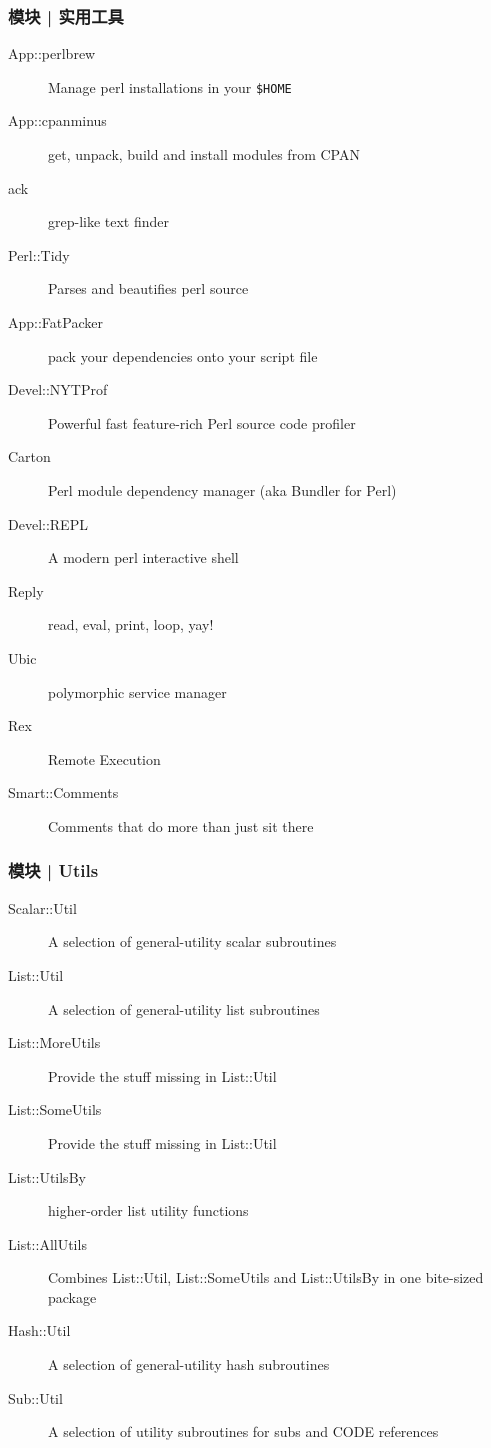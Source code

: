 \begin{frame}[fragile]
  \frametitle{模块 | 实用工具}
    \begin{description}
      \item[App::perlbrew] Manage perl installations in your \verb|$HOME| 
      \item[App::cpanminus] get, unpack, build and install modules from CPAN
      \item[ack] grep-like text finder
      \item[Perl::Tidy] Parses and beautifies perl source
      \item[App::FatPacker] pack your dependencies onto your script file
      \item[Devel::NYTProf] Powerful fast feature-rich Perl source code profiler
      \item[Carton] Perl module dependency manager (aka Bundler for Perl)
      \item[Devel::REPL] A modern perl interactive shell
      \item[Reply] read, eval, print, loop, yay!
      \item[Ubic] polymorphic service manager
      \item[Rex] Remote Execution
      \item[\alert{Smart::Comments}] Comments that do more than just sit there
    \end{description}
\end{frame}

\begin{frame}
  \frametitle{模块 | Utils}
    \begin{description}
      \item[Scalar::Util] A selection of general-utility scalar subroutines
      \item[\alert{List::Util}] A selection of general-utility list subroutines
      \item[List::MoreUtils] Provide the stuff missing in List::Util
      \item[List::SomeUtils] Provide the stuff missing in List::Util
      \item[List::UtilsBy] higher-order list utility functions
      \item[List::AllUtils] Combines List::Util, List::SomeUtils and List::UtilsBy in one bite-sized package
      \item[Hash::Util] A selection of general-utility hash subroutines
      \item[Sub::Util] A selection of utility subroutines for subs and CODE references
    \end{description}
\end{frame}

